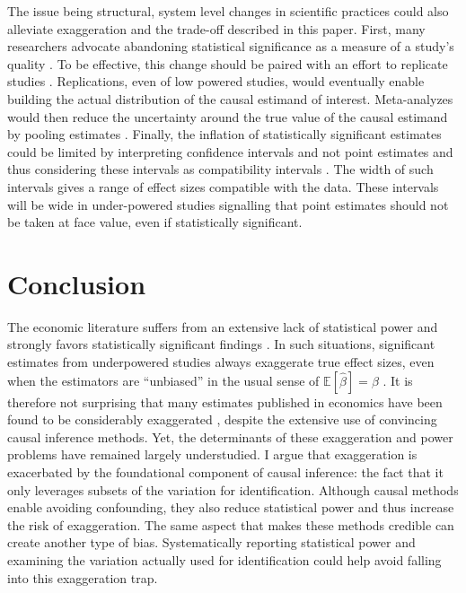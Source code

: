 \documentclass[usletter, 12pt]{article}
\begin{document}
			The issue being structural, system level changes in scientific practices could also alleviate exaggeration and the trade-off described in this paper. First, many researchers advocate abandoning statistical significance as a measure of a study's quality \citep{mcshane_abandon_2019}. To be effective, this change should be paired with an effort to replicate studies \citep{christensen_transparency_2018}. Replications, even of low powered studies, would eventually enable building the actual distribution of the causal estimand of interest. Meta-analyzes would then reduce the uncertainty around the true value of the causal estimand by pooling estimates \citep{hernan_causal_2022}. Finally, the inflation of statistically significant estimates could be limited by interpreting confidence intervals and not point estimates and thus considering these intervals as compatibility intervals \citep{shadish_experimental_2002, amrhein_inferential_2019, romer_praise_2020}. The width of such intervals gives a range of effect sizes compatible with the data. These intervals will be wide in under-powered studies signalling that point estimates should not be taken at face value, even if statistically significant.




\section{Conclusion} \label{conclusion}

	The economic literature suffers from an extensive lack of statistical power \citep{ioannidis_power_2017} and strongly favors statistically significant findings \citep[for instance]{rosenthal_file_1979, andrews_identification_2019, abadie_statistical_2020, brodeur_methods_2020}. In such situations, significant estimates from underpowered studies always exaggerate true effect sizes, even when the estimators are ``unbiased'' in the usual sense of $\mathbb{E}[\hat{\beta}] = \beta$ \citep{gelmanType2000, ioannidis_why_2008, gelman_beyond_2014}. It is therefore not surprising that many estimates published in economics have been found to be considerably exaggerated \citep{ioannidis_power_2017}, despite the extensive use of convincing causal inference methods. Yet, the determinants of these exaggeration and power problems have remained largely understudied. I argue that exaggeration is exacerbated by the foundational component of causal inference: the fact that it only leverages subsets of the variation for identification. Although causal methods enable avoiding confounding, they also reduce statistical power and thus increase the risk of exaggeration. The same aspect that makes these methods credible can create another type of bias. Systematically reporting statistical power and examining the variation actually used for identification could help avoid falling into this exaggeration trap.
\end{document}

